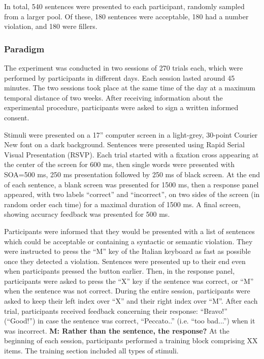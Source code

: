 In total, 540 sentences were presented to each participant, randomly sampled from a larger pool. Of these, 180 sentences were acceptable, 180 had a number violation, and 180 were fillers.

\subsubsection{Paradigm}
The experiment was conducted in two sessions of 270 trials each, which were performed by participants in different days. Each session lasted around 45 minutes. The two sessions took place at the same time of the day at a maximum temporal distance of two weeks. After receiving information about the experimental procedure, participants were asked to sign a written informed consent. 

Stimuli were presented on a 17” computer screen in a light-grey, 30-point Courier New font on a dark background. Sentences were presented using Rapid Serial Visual Presentation (RSVP). Each trial started with a fixation cross appearing at the center of the screen for 600 ms, then single words were presented with SOA=500 ms, 250 ms presentation followed by 250 ms of black screen. At the end of each sentence, a blank screen was presented for 1500 ms, then a response panel appeared, with two labels “correct” and “incorrect”, on two sides of the screen (in random order each time) for a maximal duration of 1500 ms. A final screen, showing accuracy feedback was presented for 500 ms.

Participants were informed that they would be presented with a list of sentences which could be acceptable or containing a syntactic or semantic violation. They were instructed to press the “M” key of the Italian keyboard as fast as possible once they detected a violation. Sentences were presented up to their end even when participants pressed the button earlier. Then, in the response panel, participants were asked to press the “X” key if the sentence was correct, or “M” when the sentence was not correct. During the entire session, participants were asked to keep their left index over “X” and their right index over “M”. After each trial, participants received feedback concerning their response: ``Bravo!'' (``Good!'') in  case the sentence was correct, ``Peccato..'' (i.e. ``too bad...'') when it was incorrect. \textbf{M: Rather than the sentence, the response?} At the beginning of each session, participants performed a training block comprising XX items. The training section included all types of stimuli.

